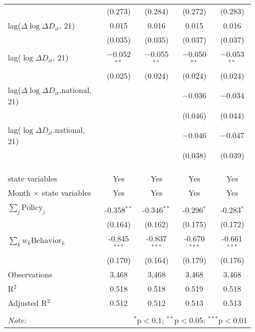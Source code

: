 \begin{tabular}{@{\extracolsep{1pt}}lcccc}
  & (0.273) & (0.284) & (0.272) & (0.283) \\ 
  lag($\Delta \log \Delta D_{it}$, 21) & 0.015 & 0.016 & 0.015 & 0.016 \\ 
  & (0.035) & (0.035) & (0.037) & (0.037) \\ 
  lag($\log \Delta D_{it}$, 21) & $-$0.052$^{**}$ & $-$0.055$^{**}$ & $-$0.050$^{**}$ & $-$0.053$^{**}$ \\ 
  & (0.025) & (0.024) & (0.024) & (0.024) \\ 
  lag($\Delta \log \Delta D_{it}$.national, 21) &  &  & $-$0.036 & $-$0.034 \\ 
  &  &  & (0.046) & (0.044) \\ 
  lag($\log \Delta D_{it}$.national, 21) &  &  & $-$0.046 & $-$0.047 \\ 
  &  &  & (0.038) & (0.039) \\ 
   &  &  &  &  \\ 
  &  &  &  &  \\ 
 \hline \\[-1.8ex] 
state variables & Yes & Yes & Yes & Yes \\ 
Month $\times$ state variables & Yes & Yes & Yes & Yes \\ 
\hline \\[-1.8ex] 
$\sum_j \mathrm{Policy}_j$ & -0.358$^{**}$ & -0.346$^{**}$ & -0.296$^{*}$ & -0.283$^{*}$ \\ 
 & (0.164) & (0.162) & (0.175) & (0.172) \\ 
$\sum_k w_k \mathrm{Behavior}_k$ & -0.845$^{***}$ & -0.837$^{***}$ & -0.670$^{***}$ & -0.661$^{***}$ \\ 
 & (0.170) & (0.164) & (0.179) & (0.176) \\ 
Observations & 3,468 & 3,468 & 3,468 & 3,468 \\ 
R$^{2}$ & 0.518 & 0.518 & 0.519 & 0.518 \\ 
Adjusted R$^{2}$ & 0.512 & 0.512 & 0.513 & 0.513 \\ 
\hline 
\hline \\[-1.8ex] 
\textit{Note:}  & \multicolumn{4}{r}{$^{*}$p$<$0.1; $^{**}$p$<$0.05; $^{***}$p$<$0.01} \\ 
\end{tabular} 